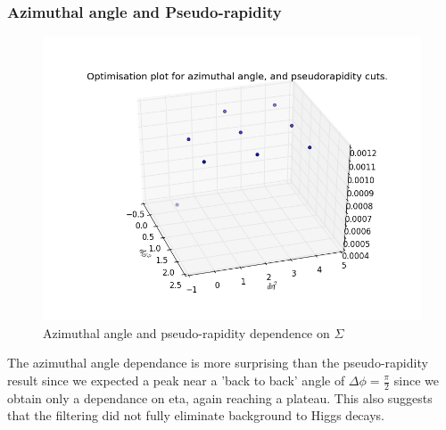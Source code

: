 \documentclass{article}
\begin{document}
\subsubsection{Azimuthal angle and Pseudo-rapidity}
\begin{figure}
\includegraphics[scale=0.5]{etaphi1}
\caption{Azimuthal angle and pseudo-rapidity dependence on $\Sigma$}
\end{figure}
The azimuthal angle dependance is more surprising than the pseudo-rapidity result since we expected a peak near a 'back to back' angle of $\Delta \phi = \frac{\pi}{2}$ since we obtain only a dependance on eta, again reaching a plateau. This also suggests that the filtering did not fully eliminate background to Higgs decays. 
\end{document}
